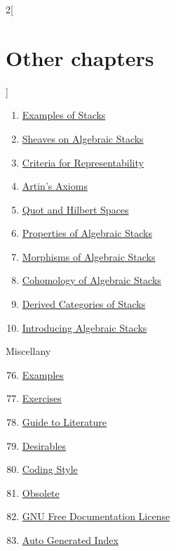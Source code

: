 \begin{multicols}{2}[\section{Other chapters}]
\begin{enumerate}
\item \hyperref[examples-stacks-section-phantom]{Examples of Stacks}
\item \hyperref[stacks-sheaves-section-phantom]{Sheaves on Algebraic Stacks}
\item \hyperref[criteria-section-phantom]{Criteria for Representability}
\item \hyperref[artin-section-phantom]{Artin's Axioms}
\item \hyperref[quot-section-phantom]{Quot and Hilbert Spaces}
\item \hyperref[stacks-properties-section-phantom]{Properties of Algebraic Stacks}
\item \hyperref[stacks-morphisms-section-phantom]{Morphisms of Algebraic Stacks}
\item \hyperref[stacks-cohomology-section-phantom]{Cohomology of Algebraic Stacks}
\item \hyperref[stacks-perfect-section-phantom]{Derived Categories of Stacks}
\item \hyperref[stacks-introduction-section-phantom]{Introducing Algebraic Stacks}
\end{enumerate}
Miscellany
\begin{enumerate}
\setcounter{enumi}{75}
\item \hyperref[examples-section-phantom]{Examples}
\item \hyperref[exercises-section-phantom]{Exercises}
\item \hyperref[guide-section-phantom]{Guide to Literature}
\item \hyperref[desirables-section-phantom]{Desirables}
\item \hyperref[coding-section-phantom]{Coding Style}
\item \hyperref[obsolete-section-phantom]{Obsolete}
\item \hyperref[fdl-section-phantom]{GNU Free Documentation License}
\item \hyperref[index-section-phantom]{Auto Generated Index}
\end{enumerate}
\end{multicols}
